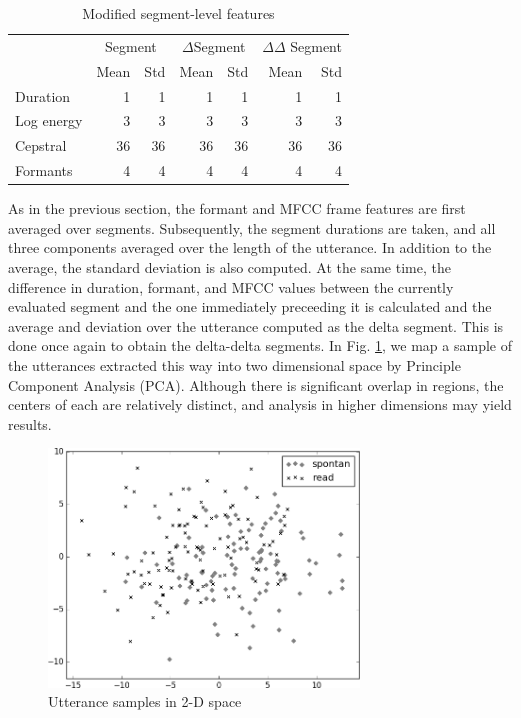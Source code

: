\documentclass[conference]{IEEEtran}
\begin{document}
\begin{table}[!htb]
\renewcommand{\arraystretch}{1.3}
\caption{Modified segment-level features}
\label{seg_feats}
\centering
\begin{tabular}{l|r|r|r|r|r|r|}
    \cline{2-7}
    {} & \multicolumn{2}{|c|}{Segment}
    & \multicolumn{2}{|c|}{$\Delta$Segment}
    & \multicolumn{2}{|c|}{$\Delta\Delta$ Segment} \\
    \cline{2-7}
    {} & Mean & Std & Mean & Std & Mean & Std \\
    \hline
    \multicolumn{1}{|l|}{Duration} & 1 & 1 & 1 & 1 & 1 & 1 \\
    \hline
    \multicolumn{1}{|l|}{Log energy} & 3 & 3 & 3 & 3 & 3 & 3 \\
    \hline
    
    \multicolumn{1}{|l|}{Cepstral} & 36 & 36 & 36 & 36 & 36 & 36 \\
    \hline
    \multicolumn{1}{|l|}{Formants} & 4 & 4 & 4 & 4 & 4 & 4 \\
    \hline
\end{tabular}
\end{table}

As in the previous section, the formant and MFCC frame features are first averaged over segments.
Subsequently, the segment durations are taken, and all three components averaged over the length of the utterance.
In addition to the average, the standard deviation is also computed.
At the same time, the difference in duration, formant, and MFCC values between the currently evaluated segment and the one immediately preceeding it is calculated and the average and deviation over the utterance computed as the delta segment.
This is done once again to obtain the delta-delta segments.
In Fig. \ref{pca_delseg}, we map a sample of the utterances extracted this way into two dimensional space by Principle Component Analysis (PCA).
Although there is significant overlap in regions, the centers of each are relatively distinct, and analysis in higher dimensions may 
yield results.

\begin{figure}[!htb]
\centering
\includegraphics[width=3.25in]{pca}
    \caption{Utterance samples in 2-D space}
\label{pca_delseg}
\end{figure}
\end{document}
